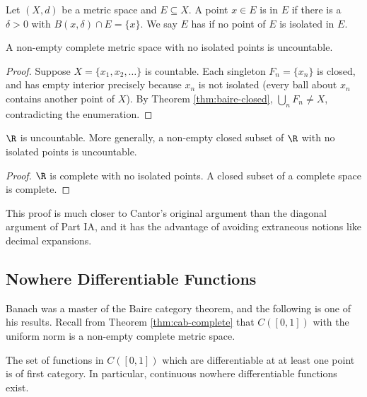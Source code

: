 \begin{definition}
	Let $(X,d)$ be a metric space and $E\subseteq X$. A point $x \in E$ is  in $E$ if there is a $\delta>0$ with $B(x,\delta)\cap E = \{x\}$. We say $E$ has  if no point of $E$ is isolated in $E$.
\end{definition}

\begin{theorem}\label{thm:no-isolated-uncountable}
	A non-empty complete metric space with no isolated points is uncountable.
\end{theorem}

\begin{proof}
	Suppose $X = \{x_1,x_2,\ldots\}$ is countable. Each singleton $F_n = \{x_n\}$ is closed, and has empty interior precisely because $x_n$ is not isolated (every ball about $x_n$ contains another point of $X$). By Theorem \ref{thm:baire-closed}, $\bigcup_nF_n\neq X$, contradicting the enumeration.
\end{proof}

\begin{corollary}
	$\R$ is uncountable. More generally, a non-empty closed subset of $\R$ with no isolated points is uncountable.
\end{corollary}

\begin{proof}
	$\R$ is complete with no isolated points. A closed subset of a complete space is complete.
\end{proof}

This proof is much closer to Cantor's original argument than the diagonal argument of Part IA, and it has the advantage of avoiding extraneous notions like decimal expansions.

\subsection{Nowhere Differentiable Functions}

Banach was a master of the Baire category theorem, and the following is one of his results. Recall from Theorem \ref{thm:cab-complete} that $C([0,1])$ with the uniform norm is a non-empty complete metric space.

\begin{theorem}[Banach]\label{thm:nowhere-diff}
	The set of functions in $C([0,1])$ which are differentiable at at least one point is of first category. In particular, continuous nowhere differentiable functions exist.
\end{theorem}

